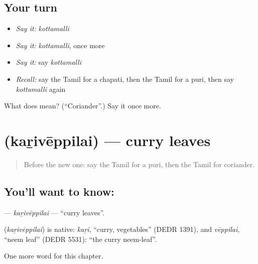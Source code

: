 \subsection*{Your turn}
\begin{itemize}
\raggedright
  \item \emph{Say it:} \emph{kottamalli}
  \item \emph{Say it:} \emph{kottamalli}, once more
  \item \emph{Say it:} say \emph{kottamalli}
  \item \emph{Recall:} say the Tamil for a chapati, then the Tamil for a puri, then say \emph{kottamalli} again
\end{itemize}

\begin{tcolorbox}[breakable,colback=teal!4,colframe=teal!35!black,title={Before you move on}]
What does  mean? (\textquotedblleft{}Coriander\textquotedblright{}.) Say it once more.
\end{tcolorbox}
\section[\texorpdfstring{\ta{கறிவேப்பிலை} (kaṟivēppilai)}{கறிவேப்பிலை (kaṟivēppilai)}]{ (kaṟivēppilai) — curry leaves}

\label{lesson:TA-C271-kariveppilai}



\begin{quote}
Before the new one: say the Tamil for a puri, then the Tamil for coriander.
\end{quote}

\subsection*{You'll want to know: }
\textbf{} — \emph{kaṟivēppilai} — \textquotedblleft{}curry leaves\textquotedblright{}.

\begin{cousinweb}
\textbf{} (\emph{kaṟivēppilai}) is native: \emph{kaṟi}, \textquotedblleft{}curry, vegetables\textquotedblright{} (DEDR 1391), and \emph{vēppilai}, \textquotedblleft{}neem leaf\textquotedblright{} (DEDR 5531): \textquotedblleft{}the curry neem-leaf\textquotedblright{}.
\end{cousinweb}

\begin{grammarlens}[title={What you've built}]
One more word for this chapter.
\end{grammarlens}

